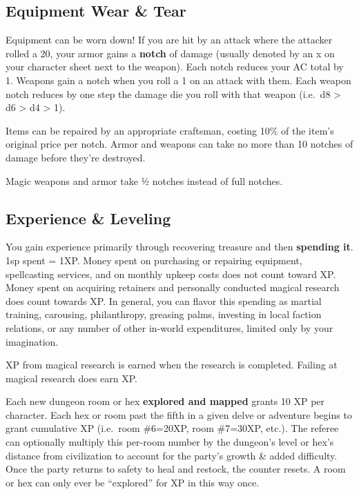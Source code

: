 \documentclass{article}
\begin{document}
\begin{multicols}{2}
\subsection{Equipment Wear \& Tear}\label{equipment-wear-tear}

Equipment can be worn down! If you are hit by an attack where the
attacker rolled a 20, your armor gains a \textbf{notch} of damage
(usually denoted by an x on your character sheet next to the weapon).
Each notch reduces your AC total by 1. Weapons gain a notch when you
roll a 1 on an attack with them. Each weapon notch reduces by one step
the damage die you roll with that weapon (i.e.~d8 \textgreater{} d6
\textgreater{} d4 \textgreater{} 1).

Items can be repaired by an appropriate craftsman, costing 10\% of the
item's original price per notch. Armor and weapons can take no more than
10 notches of damage before they're destroyed.

Magic weapons and armor take ½ notches instead of full notches.

\subsection{Experience \& Leveling}\label{experience-leveling}

You gain experience primarily through recovering treasure and then
\textbf{spending it}. 1sp spent = 1XP. Money spent on purchasing or
repairing equipment, spellcasting services, and on monthly upkeep costs
does not count toward XP. Money spent on acquiring retainers and
personally conducted magical research does count towards XP. In general,
you can flavor this spending as martial training, carousing,
philanthropy, greasing palms, investing in local faction relations, or
any number of other in-world expenditures, limited only by your
imagination.

XP from magical research is earned when the research is completed.
Failing at magical research does earn XP.

Each new dungeon room or hex \textbf{explored and mapped} grants 10 XP
per character. Each hex or room past the fifth in a given delve or
adventure begins to grant cumulative XP (i.e.~room \#6=20XP, room
\#7=30XP, etc.). The referee can optionally multiply this per-room
number by the dungeon's level or hex's distance from civilization to
account for the party's growth \& added difficulty. Once the party
returns to safety to heal and restock, the counter resets. A room or hex
can only ever be ``explored'' for XP in this way once.


\end{multicols}
\end{document}

